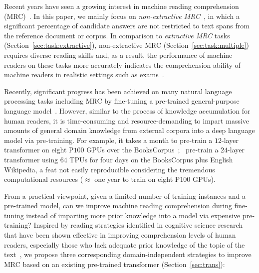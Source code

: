 \documentclass[11pt,a4paper]{article}
\begin{document}
Recent years have seen a growing interest in machine reading comprehension (MRC)~\cite{rajpurkar2016squad,choi2018quac,kovcisky2018narrativeqa,reddy2018coqa}. In this paper, we mainly focus on \textit{non-extractive MRC}~\cite{khashabi2018looking,ostermann2018semeval,clark2018think}, in which a significant percentage of candidate answers are not restricted to text spans from the reference document or corpus. In comparison to \textit{extractive MRC} tasks (Section~\ref{sec:task:extractive}), non-extractive MRC (Section~\ref{sec:task:multiple}) requires diverse reading skills and, as a result, the performance of machine readers on these tasks more accurately indicates the comprehension ability of machine readers in realistic settings such as exams~\cite{lai2017race}. 

Recently, significant progress has been achieved on many natural language processing tasks including MRC by fine-tuning a pre-trained general-purpose language model~\cite{radfordimproving,bert2018}. 
However, similar to the process of knowledge accumulation for human readers, it is time-consuming and resource-demanding to impart massive amounts of general domain knowledge from external corpora into a deep language model via pre-training. For example, it takes a month to pre-train a $12$-layer transformer on eight P$100$ GPUs over the BooksCorpus~\cite{zhu2015aligning,radfordimproving};~ pre-train a $24$-layer transformer using $64$ TPUs for four days on the BooksCorpus plus English Wikipedia, a feat not easily reproducible considering the tremendous computational resources ($\approx$ one year to train on eight P$100$ GPUs).  

From a practical viewpoint, given a limited number of training instances and a pre-trained model, can we improve machine reading comprehension during fine-tuning instead of imparting more prior knowledge into a model via expensive pre-training? Inspired by reading strategies identified in cognitive science research that have been shown effective in improving comprehension levels of human readers, especially those who lack adequate prior knowledge of the topic of the text~\cite{mokhtari2002measuring,mokhtari2002assessing,mcnamara2004istart}, we propose three corresponding domain-independent strategies to improve MRC based on an existing pre-trained transformer (Section~\ref{sec:trans}): 
\end{document}
